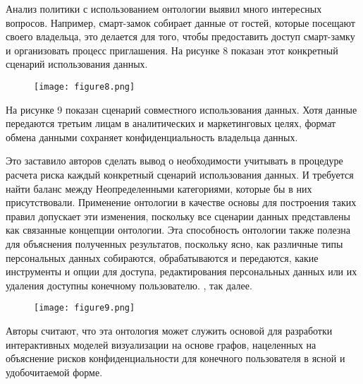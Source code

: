 \documentclass[../main]{subfiles}
\begin{document}
Анализ политики с использованием онтологии выявил много интересных вопросов. Например, смарт-замок собирает данные от гостей, которые посещают своего владельца, это делается для того, чтобы предоставить доступ смарт-замку и организовать процесс приглашения. На рисунке 8 показан этот конкретный сценарий использования данных.

\begin{figure}[H]
    \centering
    {\texttt{[image: figure8.png]}}
    \vspace{-\baselineskip}
\end{figure}

На рисунке 9 показан сценарий совместного использования данных. Хотя данные передаются третьим лицам в аналитических и маркетинговых целях, формат обмена данными сохраняет конфиденциальность владельца данных.

Это заставило авторов сделать вывод о необходимости учитывать в процедуре расчета риска каждый конкретный сценарий использования данных. И требуется найти баланс между Неопределенными категориями, которые бы в них присутствовали. Применение онтологии в качестве основы для построения таких правил допускает эти изменения, поскольку все сценарии данных представлены как связанные концепции онтологии. Эта способность онтологии также полезна для объяснения полученных результатов, поскольку ясно, как различные типы персональных данных собираются, обрабатываются и передаются, какие инструменты и опции для доступа, редактирования персональных данных или их удаления доступны конечному пользователю. , так далее.

\begin{figure}[H]
    \centering
    {\texttt{[image: figure9.png]}}
    \vspace{-\baselineskip}
\end{figure}

Авторы считают, что эта онтология может служить основой для разработки интерактивных моделей визуализации на основе графов, нацеленных на объяснение рисков конфиденциальности для конечного пользователя в ясной и удобочитаемой форме. 
\end{document}
